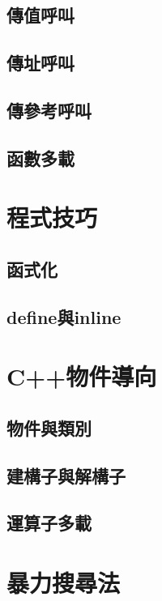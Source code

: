 \documentclass[utf8]{beamer}
\begin{document}
\begin{CJK}{UTF8}{bkai}
\subsection{傳值呼叫}
\subsection{傳址呼叫}
\subsection{傳參考呼叫}
\subsection{函數多載}

\section{程式技巧}
\subsection{函式化}
\subsection{define與inline}

\section{C++物件導向}
\subsection{物件與類別}
\subsection{建構子與解構子}
\subsection{運算子多載}

\section{暴力搜尋法}

\clearpage
\end{CJK}
\end{document}
